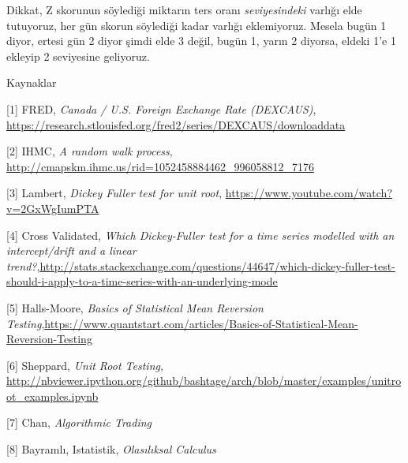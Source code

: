 \documentclass[12pt,fleqn]{article}\usepackage{../../common}
\begin{document}
Dikkat, Z skorunun söylediği miktarın ters oranı {\em seviyesindeki} varlığı
elde tutuyoruz, her gün skorun söylediği kadar varlığı eklemiyoruz. Mesela bugün
1 diyor, ertesi gün 2 diyor şimdi elde 3 değil, bugün 1, yarın 2 diyorsa, eldeki
1'e 1 ekleyip 2 seviyesine geliyoruz. 

Kaynaklar
 
[1] FRED, {\em Canada / U.S. Foreign Exchange Rate (DEXCAUS)}, \url{https://research.stlouisfed.org/fred2/series/DEXCAUS/downloaddata}

[2] IHMC, {\em A random walk process}, \url{http://cmapskm.ihmc.us/rid=1052458884462_996058812_7176}

[3] Lambert, {\em Dickey Fuller test for unit root}, \url{https://www.youtube.com/watch?v=2GxWgIumPTA}

[4] Cross Validated, {\em Which Dickey-Fuller test for a time series modelled with an intercept/drift and a linear trend?},\url{http://stats.stackexchange.com/questions/44647/which-dickey-fuller-test-should-i-apply-to-a-time-series-with-an-underlying-mode}

[5] Halls-Moore, {\em Basics of Statistical Mean Reversion Testing},\url{https://www.quantstart.com/articles/Basics-of-Statistical-Mean-Reversion-Testing}

[6] Sheppard, {\em Unit Root Testing}, \url{http://nbviewer.ipython.org/github/bashtage/arch/blob/master/examples/unitroot_examples.ipynb}

[7] Chan, {\em Algorithmic Trading}

[8] Bayramlı, Istatistik, {\em Olasılıksal Calculus}
\end{document}
